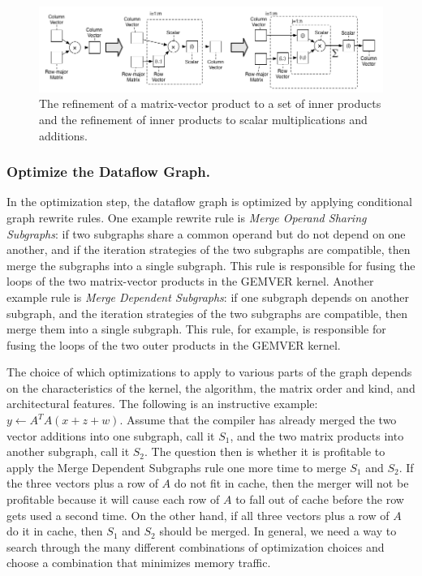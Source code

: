 \documentclass[runningheads]{llncs}
\begin{document}
\begin{figure}[hbtp]
  \centering
  \includegraphics[width=\textwidth]{figures/refine-mv-dot.png}

  \caption{The refinement of a matrix-vector product to a set of inner products and the refinement of inner products to scalar multiplications and additions.}
  \label{fig:refine-mv-dot}
\end{figure}




\subsubsection{Optimize the Dataflow Graph.}

In the optimization step, the dataflow graph is optimized by applying conditional graph rewrite rules.  One example rewrite rule is \emph{Merge Operand Sharing Subgraphs}: if two subgraphs share a common operand but do not depend on one another, and if the iteration strategies of the two subgraphs are compatible, then merge the subgraphs into a single subgraph.  This rule is responsible for fusing the loops of the two matrix-vector products in the GEMVER kernel.  Another example rule is \emph{Merge Dependent Subgraphs}: if one subgraph depends on another subgraph, and the iteration strategies of the two subgraphs are compatible, then merge them into a single subgraph.  This rule, for example, is responsible for fusing the loops of the two outer products in the GEMVER kernel.

The choice of which optimizations to apply to various parts of the graph depends on the characteristics of the kernel, the algorithm, the matrix order and kind, and architectural features.  The following is an instructive example: $y \gets A^T A (x + z + w)$.  Assume that the compiler has already merged the two vector additions into one subgraph, call it $S_1$, and the two matrix products into another subgraph, call it $S_2$. The question then is whether it is profitable to apply the Merge Dependent Subgraphs rule one more time to merge $S_1$ and $S_2$. If the three vectors plus a row of $A$ do not fit in cache, then the merger will not be profitable because it will cause each row of $A$ to fall out of cache before the row gets used a second time.  On the other hand, if all three vectors plus a row of $A$ do it in cache, then $S_1$ and $S_2$ should be merged.  In general, we need a way to search through the many different combinations of optimization choices and choose a combination that minimizes memory traffic.
\end{document}
